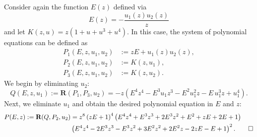 \begin{example}
  Consider again the function $E(z)$ defined via
  $$
  E(z) = - \frac{u_1(z)u_2(z)}{z}
  $$
  and let $K(z,u) = z(1 + u + u^3 + u^4)$.
  In this case, the system of polynomial equations can be defined as
  \begin{align*}
    P_1(E, z, u_1, u_2) &:= z E + u_1(z)u_2(z), \\
    P_2(E, z, u_1, u_2) &:= K(z,u_1), \\
    P_3(E, z, u_1, u_2) &:= K(z,u_2).
  \end{align*}
  We begin by eliminating $u_2$:
  \begin{equation*}
    Q(E,z,u_1) := \textbf{R}(P_1,P_3,u_2) = -z \left(E^{4} z^{4}-E^{3} u_{1} z^{3}-E^{2} u_{1}^{2} z -E \,u_{1}^{3} z +u_{1}^{4}\right).
  \end{equation*}
  Next, we eliminate $u_1$ and obtain the desired polynomial equation in $E$ and $z$:
  \begin{align*}
    P(E,z) := \textbf{R}(Q,P_2,u_2) &= z^{8} \left(z E +1\right)^{4}\left(E^{4} z^{4}+E^{3} z^{3}+2 E^{3} z^{2}+E^{2}+z E +2 E +1\right) \\
    &\left(E^{4} z^{4}-2 E^{3} z^{3}-E^{3} z^{2}+3 E^{2} z^{2}+2 E^{2} z -2 z E -E +1\right)^{2}. \qedhere
  \end{align*}
\end{example}